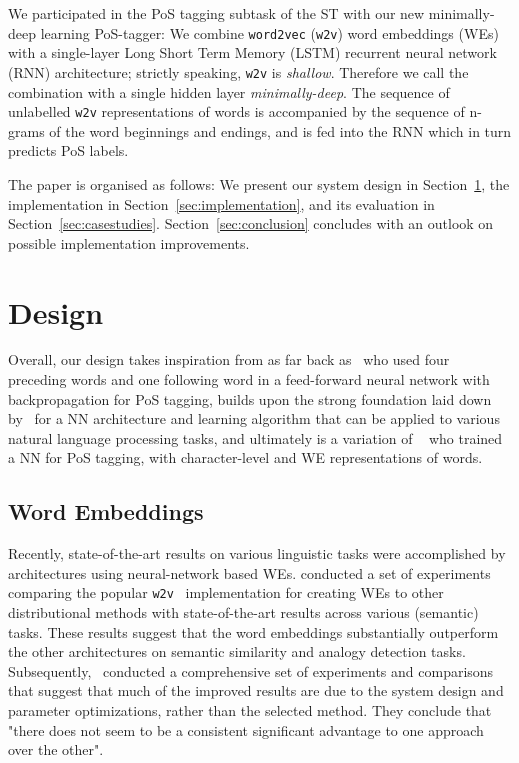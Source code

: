 \documentclass[11pt]{article}
\newcommand\wtv{\texttt{w2v}\xspace}
\begin{document}
We participated in the PoS tagging subtask of the ST with our new
minimally-deep learning PoS-tagger:
We combine \texttt{word2vec} (\wtv) word embeddings (WEs) with a single-layer
Long Short Term Memory (LSTM) recurrent neural network (RNN) architecture;
strictly speaking, \wtv is \emph{shallow}. 
Therefore we call the combination with a single hidden layer
\emph{minimally-deep}.  
The sequence of unlabelled \wtv representations of words is accompanied by
the sequence of n-grams of the word beginnings and endings, and is fed into the
RNN which in turn predicts PoS labels.

The paper is organised as follows: We present our system design in
Section~\ref{sec:design}, the implementation in
Section~\ref{sec:implementation}, and its evaluation in
Section~\ref{sec:casestudies}. 
Section~\ref{sec:conclusion} concludes with an outlook on possible
implementation improvements.


\section{Design} %
\label{sec:design}

Overall, our design takes inspiration from as far back as~
who used four preceding words and one following word in a feed-forward neural
network with backpropagation for PoS tagging, builds upon the strong foundation
laid down by~ for a NN architecture and learning
algorithm that can be applied to various natural language processing tasks, and
ultimately is a variation of
~ who trained a NN for PoS tagging, with 
character-level and WE representations of words. 


\subsection{Word Embeddings} %

Recently, state-of-the-art results on various linguistic tasks were
accomplished by architectures using neural-network based WEs.
 conducted a set of
experiments comparing the popular
\wtv~\cite{DBLP:journals/corr/abs-1301-3781,arXiv:1310.4546}
implementation for creating WEs to other distributional methods with
state-of-the-art results across various (semantic) tasks. 
These results suggest that the word embeddings substantially
outperform the other architectures on semantic similarity and analogy
detection tasks.
Subsequently,~ conducted a comprehensive set of
experiments and comparisons that suggest that much of the improved results are
due to the system design and parameter optimizations, rather than the selected
method.  
They conclude that "there does not seem to be a consistent significant
advantage to one approach over the other".
\end{document}

